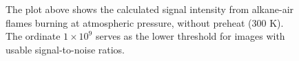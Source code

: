 \begin{figure}

\centering



\caption[- flames - I]{The plot above shows the calculated signal intensity from alkane-air flames burning at atmospheric pressure, without preheat (300 K). The ordinate \(1\times10^9\) serves as the lower threshold for images with usable signal-to-noise ratios.}

\label{fig:c1c3}

\end{figure}
